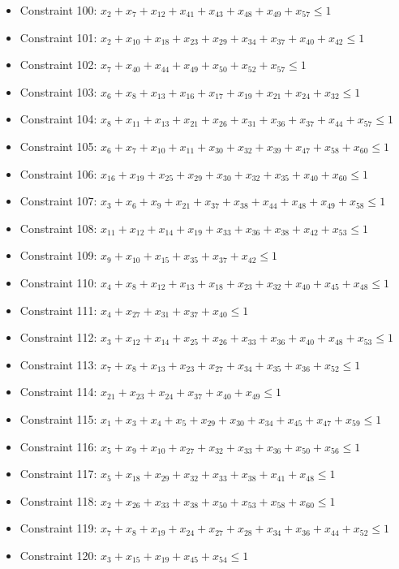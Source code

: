 \documentclass[11pt]{article}
\begin{document}
\begin{itemize}
\item Constraint 100: $x_{2} + x_{7} + x_{12} + x_{41} + x_{43} + x_{48} + x_{49} + x_{57} \le 1$
\item Constraint 101: $x_{2} + x_{10} + x_{18} + x_{23} + x_{29} + x_{34} + x_{37} + x_{40} + x_{42} \le 1$
\item Constraint 102: $x_{7} + x_{40} + x_{44} + x_{49} + x_{50} + x_{52} + x_{57} \le 1$
\item Constraint 103: $x_{6} + x_{8} + x_{13} + x_{16} + x_{17} + x_{19} + x_{21} + x_{24} + x_{32} \le 1$
\item Constraint 104: $x_{8} + x_{11} + x_{13} + x_{21} + x_{26} + x_{31} + x_{36} + x_{37} + x_{44} + x_{57} \le 1$
\item Constraint 105: $x_{6} + x_{7} + x_{10} + x_{11} + x_{30} + x_{32} + x_{39} + x_{47} + x_{58} + x_{60} \le 1$
\item Constraint 106: $x_{16} + x_{19} + x_{25} + x_{29} + x_{30} + x_{32} + x_{35} + x_{40} + x_{60} \le 1$
\item Constraint 107: $x_{3} + x_{6} + x_{9} + x_{21} + x_{37} + x_{38} + x_{44} + x_{48} + x_{49} + x_{58} \le 1$
\item Constraint 108: $x_{11} + x_{12} + x_{14} + x_{19} + x_{33} + x_{36} + x_{38} + x_{42} + x_{53} \le 1$
\item Constraint 109: $x_{9} + x_{10} + x_{15} + x_{35} + x_{37} + x_{42} \le 1$
\item Constraint 110: $x_{4} + x_{8} + x_{12} + x_{13} + x_{18} + x_{23} + x_{32} + x_{40} + x_{45} + x_{48} \le 1$
\item Constraint 111: $x_{4} + x_{27} + x_{31} + x_{37} + x_{40} \le 1$
\item Constraint 112: $x_{3} + x_{12} + x_{14} + x_{25} + x_{26} + x_{33} + x_{36} + x_{40} + x_{48} + x_{53} \le 1$
\item Constraint 113: $x_{7} + x_{8} + x_{13} + x_{23} + x_{27} + x_{34} + x_{35} + x_{36} + x_{52} \le 1$
\item Constraint 114: $x_{21} + x_{23} + x_{24} + x_{37} + x_{40} + x_{49} \le 1$
\item Constraint 115: $x_{1} + x_{3} + x_{4} + x_{5} + x_{29} + x_{30} + x_{34} + x_{45} + x_{47} + x_{59} \le 1$
\item Constraint 116: $x_{5} + x_{9} + x_{10} + x_{27} + x_{32} + x_{33} + x_{36} + x_{50} + x_{56} \le 1$
\item Constraint 117: $x_{5} + x_{18} + x_{29} + x_{32} + x_{33} + x_{38} + x_{41} + x_{48} \le 1$
\item Constraint 118: $x_{2} + x_{26} + x_{33} + x_{38} + x_{50} + x_{53} + x_{58} + x_{60} \le 1$
\item Constraint 119: $x_{7} + x_{8} + x_{19} + x_{24} + x_{27} + x_{28} + x_{34} + x_{36} + x_{44} + x_{52} \le 1$
\item Constraint 120: $x_{3} + x_{15} + x_{19} + x_{45} + x_{54} \le 1$
\end{itemize}
\end{document}
